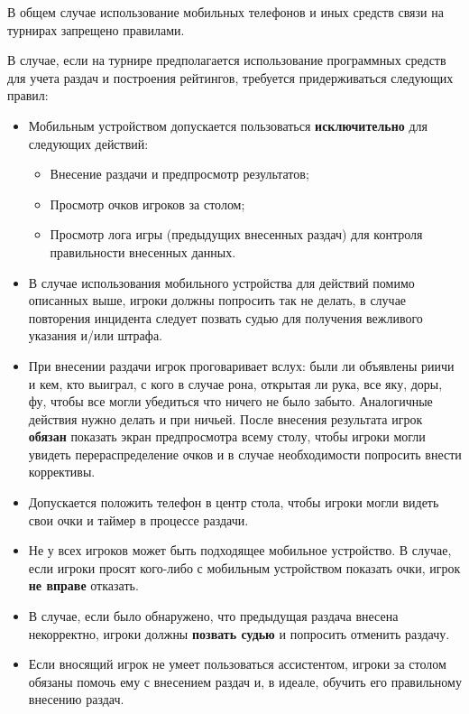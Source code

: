 В общем случае использование мобильных телефонов и иных средств связи на турнирах запрещено правилами.

В случае, если на турнире предполагается использование программных средств для учета раздач и построения рейтингов, требуется придерживаться следующих правил:

\begin{itemize}
	\item Мобильным устройством допускается пользоваться \textbf{исключительно} для следующих действий:
	\begin{itemize}
		\item Внесение раздачи и предпросмотр результатов;
		\item Просмотр очков игроков за столом;
		\item Просмотр лога игры (предыдущих внесенных раздач) для контроля правильности внесенных данных.
	\end{itemize}
	\item В случае использования мобильного устройства для действий помимо описанных выше, игроки должны попросить так не делать, в случае повторения инцидента следует позвать судью для получения вежливого указания и/или штрафа.
	\item При внесении раздачи игрок проговаривает вслух: были ли объявлены риичи и кем, кто выиграл, с кого в случае рона, открытая ли рука, все яку, доры, фу, чтобы все могли убедиться что ничего не было забыто. Аналогичные действия нужно делать и при ничьей. После внесения результата игрок \textbf{обязан} показать экран предпросмотра всему столу, чтобы игроки могли увидеть перераспределение очков и в случае необходимости попросить внести коррективы.
	\item Допускается положить телефон в центр стола, чтобы игроки могли видеть свои очки и таймер в процессе раздачи.
	\item Не у всех игроков может быть подходящее мобильное устройство. В случае, если игроки просят кого-либо с мобильным устройством показать очки, игрок \textbf{не вправе} отказать.
	\item В случае, если было обнаружено, что предыдущая раздача внесена некорректно, игроки должны \textbf{позвать судью} и попросить отменить раздачу.
	\item Если вносящий игрок не умеет пользоваться ассистентом, игроки за столом обязаны помочь ему с внесением раздач и, в идеале, обучить его правильному внесению раздач.
\end{itemize}


